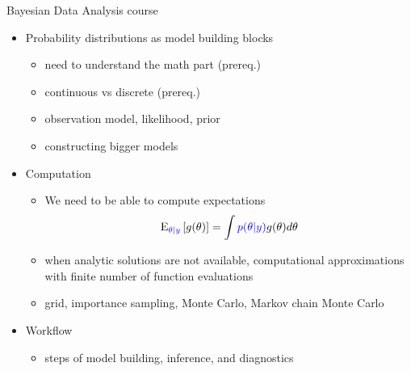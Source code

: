 \documentclass[english,t]{beamer}
\newcommand{\E}{\mathrm{E}}
\begin{document}
\begin{frame}{Bayesian Data Analysis course}

  \begin{itemize}
  \item Probability distributions as model building blocks
    \begin{itemize}
    \item need to understand the math part (prereq.)
    \item continuous vs discrete (prereq.)
    \item observation model, likelihood, prior
    \item constructing bigger models
    \end{itemize}
  \item<2-> Computation
    \begin{itemize}
    \item 
  We need to be able to compute expectations%
  \begin{align*}
    \E_{\color{blue}{\theta|y}}\left[ g(\theta) \right] = \int {\color{blue}p(\theta|y)}g(\theta) d\theta
  \end{align*}
    \item when analytic solutions are not available, computational
      approximations with finite number of function evaluations
    \item grid, importance sampling, Monte Carlo, Markov chain Monte Carlo
    \end{itemize}
  \item<3-> Workflow
    \begin{itemize}
    \item steps of model building, inference, and diagnostics
    \end{itemize}
  \end{itemize}
  
\end{frame}
\end{document}
